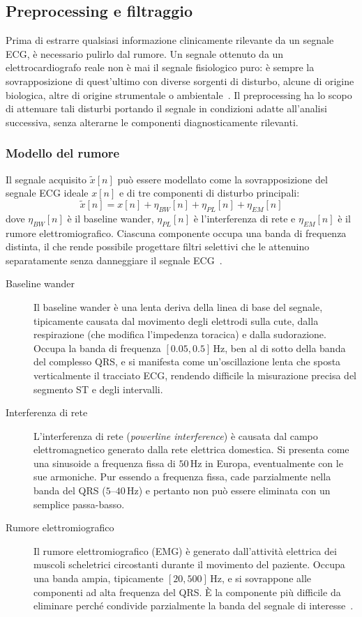 \subsection{Preprocessing e filtraggio}
\label{sec:preprocessing}
Prima di estrarre qualsiasi informazione clinicamente rilevante da un segnale ECG, è necessario pulirlo dal rumore. Un segnale ottenuto da un elettrocardiografo reale non è mai il segnale fisiologico puro: è sempre la sovrapposizione di quest'ultimo con diverse sorgenti di disturbo, alcune di origine biologica, altre di origine strumentale o ambientale~\cite{sornmo2005bioelectrical}. Il preprocessing ha lo scopo di attenuare tali disturbi portando il segnale in condizioni adatte all'analisi successiva, senza alterarne le componenti diagnosticamente rilevanti.

\subsubsection{Modello del rumore}
Il segnale acquisito $\tilde{x}[n]$ può essere modellato come la sovrapposizione del segnale ECG ideale $x[n]$ e di tre componenti di disturbo principali:
\[
\tilde{x}[n] = x[n] + \eta_{BW}[n] + \eta_{PL}[n] +
\eta_{EM}[n]
\]
dove $\eta_{BW}[n]$ è il baseline wander, $\eta_{PL}[n]$ è l'interferenza di rete e $\eta_{EM}[n]$ è il rumore elettromiografico. Ciascuna componente occupa una banda di frequenza distinta, il che rende possibile progettare filtri selettivi che le attenuino separatamente senza danneggiare il segnale ECG~\cite{sornmo2005bioelectrical}.

\begin{description}
	\item[Baseline wander] Il baseline wander è una lenta deriva della linea di base del segnale, tipicamente causata dal movimento degli elettrodi sulla cute, dalla respirazione (che modifica l'impedenza toracica) e dalla sudorazione. Occupa la banda di frequenza $[0.05, 0.5]\,\text{Hz}$, ben al di sotto della banda del complesso QRS, e si manifesta come un'oscillazione lenta che sposta verticalmente il tracciato ECG, rendendo difficile la misurazione precisa del segmento ST e degli intervalli.
	
	\item[Interferenza di rete] L'interferenza di rete (\textit{powerline interference}) è causata dal campo elettromagnetico generato dalla rete elettrica domestica. Si presenta come una sinusoide a frequenza fissa di $50\,\text{Hz}$ in Europa, eventualmente con le sue armoniche. Pur essendo a frequenza fissa, cade parzialmente nella banda del QRS ($5$--$40\,\text{Hz}$) e pertanto non può essere eliminata con un semplice passa-basso.
	
	\item[Rumore elettromiografico] Il rumore elettromiografico (EMG) è generato dall'attività elettrica dei muscoli scheletrici circostanti durante il movimento del paziente. Occupa una banda ampia, tipicamente $[20, 500]\,\text{Hz}$, e si sovrappone alle componenti ad alta frequenza del QRS. È la componente più difficile da eliminare perché condivide parzialmente la banda del segnale di interesse~\cite{sornmo2005bioelectrical}.
\end{description}

